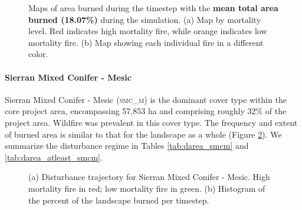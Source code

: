 \begin{figure}[!htbp]
  \centering
  \caption{Maps of area burned during the timestep with the \textbf{mean total area burned (18.07\%)} during the simulation. (a) Map by mortality level. Red indicates high mortality fire, while orange indicates low mortality fire. (b) Map showing each individual fire in a different color.}
  \label{fig:darea_mean_map}
\end{figure}

\clearpage


\paragraph{Sierran Mixed Conifer - Mesic}
Sierran Mixed Conifer - Mesic (\textsc{smc\_m}) is the dominant cover type within the core project area, encompassing 57,853 ha and comprising roughly 32\% of the project area. Wildfire was prevalent in this cover type. The frequency and extent of burned area is similar to that for the landscape as a whole (Figure \ref{fig:darea_smcm}). We summarize the disturbance regime in Tables \ref{tab:darea_smcm} and \ref{tab:darea_atleast_smcm}.

\begin{figure}[!htbp]
  \centering
  \caption{\small (a) Disturbance trajectory for Sierran Mixed Conifer - Mesic. High mortality fire in red; low mortality fire in green. (b) Histogram of the percent of the landscape burned per timestep.} 
  \label{fig:darea_smcm}
\end{figure}

